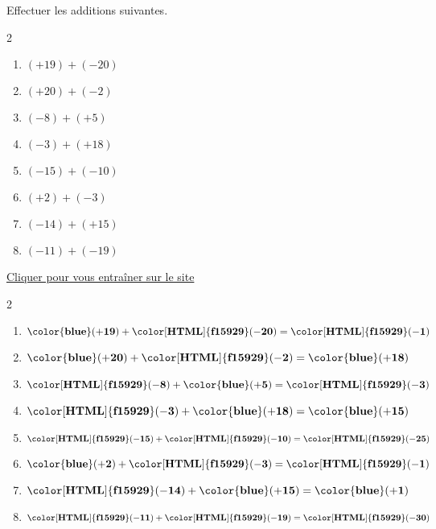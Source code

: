 \begin{exercice*}
    Effectuer les additions suivantes.
    \begin{multicols}2
        \begin{enumerate}            
                \item $ (+19) + (-20)$
                \item $ (+20) + (-2)$
                \item $ (-8) + (+5)$
                \item $ (-3) + (+18)$
                \item $ (-15) + (-10)$
                \item $ (+2) + (-3)$
                \item $ (-14) + (+15)$
                \item $ (-11) + (-19)$            
        \end{enumerate}
    \end{multicols}

    \href{https://coopmaths.fr/mathalea.html?ex=5R20,s=20,s2=false,s3=false,n=10,i=1&v=l&z=1}{Cliquer pour vous entraîner sur le site \mathaleaLogo} 
\end{exercice*}
\begin{corrige}
    \phantom{rrr}    
    \begin{multicols}2
        \begin{enumerate}
            \item $ \mathbf{{\color{blue}(+19)}} + \mathbf{{\color[HTML]{f15929}(-20)}} = \mathbf{{\color[HTML]{f15929}(-1)}} $
            \item $ \mathbf{{\color{blue}(+20)}} + \mathbf{{\color[HTML]{f15929}(-2)}} = \mathbf{{\color{blue}(+18)}} $
            \item $ \mathbf{{\color[HTML]{f15929}(-8)}} + \mathbf{{\color{blue}(+5)}} = \mathbf{{\color[HTML]{f15929}(-3)}} $
            \item $ \mathbf{{\color[HTML]{f15929}(-3)}} + \mathbf{{\color{blue}(+18)}} = \mathbf{{\color{blue}(+15)}} $
            \item $ \mathbf{{\color[HTML]{f15929}(-15)}} + \mathbf{{\color[HTML]{f15929}(-10)}} = \mathbf{{\color[HTML]{f15929}(-25)}} $
            \item $ \mathbf{{\color{blue}(+2)}} + \mathbf{{\color[HTML]{f15929}(-3)}} = \mathbf{{\color[HTML]{f15929}(-1)}} $
            \item $ \mathbf{{\color[HTML]{f15929}(-14)}} + \mathbf{{\color{blue}(+15)}} = \mathbf{{\color{blue}(+1)}} $
            \item $ \mathbf{{\color[HTML]{f15929}(-11)}} + \mathbf{{\color[HTML]{f15929}(-19)}} = \mathbf{{\color[HTML]{f15929}(-30)}} $
        \end{enumerate}   
    \end{multicols}
\end{corrige}